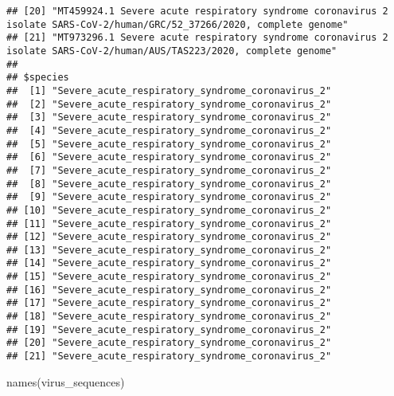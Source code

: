 \documentclass[
]{article}
\newenvironment{Shaded}{\begin{snugshade}}{\end{snugshade}}
\newcommand{\FunctionTok}[1]{\textcolor[rgb]{0.00,0.00,0.00}{#1}}
\newcommand{\NormalTok}[1]{#1}
\begin{document}
\begin{verbatim}
## [20] "MT459924.1 Severe acute respiratory syndrome coronavirus 2 isolate SARS-CoV-2/human/GRC/52_37266/2020, complete genome"                                                                                                                                                                                                                                                                                                                                                                                                           
## [21] "MT973296.1 Severe acute respiratory syndrome coronavirus 2 isolate SARS-CoV-2/human/AUS/TAS223/2020, complete genome"                                                                                                                                                                                                                                                                                                                                                                                                             
## 
## $species
##  [1] "Severe_acute_respiratory_syndrome_coronavirus_2"
##  [2] "Severe_acute_respiratory_syndrome_coronavirus_2"
##  [3] "Severe_acute_respiratory_syndrome_coronavirus_2"
##  [4] "Severe_acute_respiratory_syndrome_coronavirus_2"
##  [5] "Severe_acute_respiratory_syndrome_coronavirus_2"
##  [6] "Severe_acute_respiratory_syndrome_coronavirus_2"
##  [7] "Severe_acute_respiratory_syndrome_coronavirus_2"
##  [8] "Severe_acute_respiratory_syndrome_coronavirus_2"
##  [9] "Severe_acute_respiratory_syndrome_coronavirus_2"
## [10] "Severe_acute_respiratory_syndrome_coronavirus_2"
## [11] "Severe_acute_respiratory_syndrome_coronavirus_2"
## [12] "Severe_acute_respiratory_syndrome_coronavirus_2"
## [13] "Severe_acute_respiratory_syndrome_coronavirus_2"
## [14] "Severe_acute_respiratory_syndrome_coronavirus_2"
## [15] "Severe_acute_respiratory_syndrome_coronavirus_2"
## [16] "Severe_acute_respiratory_syndrome_coronavirus_2"
## [17] "Severe_acute_respiratory_syndrome_coronavirus_2"
## [18] "Severe_acute_respiratory_syndrome_coronavirus_2"
## [19] "Severe_acute_respiratory_syndrome_coronavirus_2"
## [20] "Severe_acute_respiratory_syndrome_coronavirus_2"
## [21] "Severe_acute_respiratory_syndrome_coronavirus_2"
\end{verbatim}

\begin{Shaded}
\begin{Highlighting}[]
\FunctionTok{names}\NormalTok{(virus\_sequences)}
\end{Highlighting}
\end{Shaded}
\end{document}
